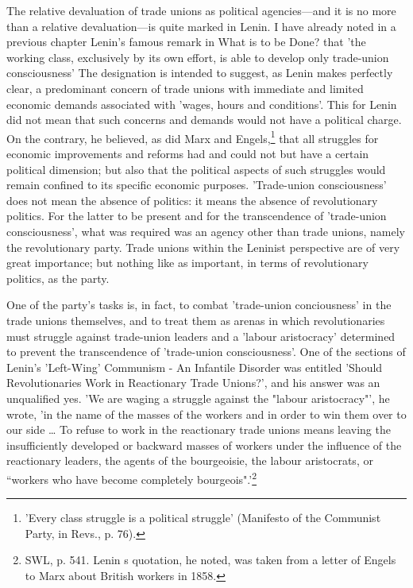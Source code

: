 The relative devaluation of trade unions as political agencies—and it is no more than a relative devaluation—is quite marked in Lenin. I have already noted in a previous chapter Lenin's famous remark in What is to be Done? that 'the working class, exclusively by its own effort, is able to develop only trade-union consciousness' The designation is intended to suggest, as Lenin makes perfectly clear, a predominant concern of trade unions with immediate and limited economic demands associated with 'wages, hours and conditions'. This for Lenin did not mean that such concerns and demands would not have a political charge. On the contrary, he believed, as did Marx and Engels,\footnote{'Every class struggle is a political struggle' (Manifesto of the Communist Party, in Revs., p. 76).} that all struggles for economic improvements and reforms had and could not but have a certain political dimension; but also that the political aspects of such struggles would remain confined to its specific economic purposes. 'Trade\hyp{}union consciousness' does not mean the absence of politics: it means the absence of revolutionary politics. For the latter to be present and for the transcendence of 'trade-union consciousness', what was required was an agency other than trade unions, namely the revolutionary party. Trade unions within the Leninist perspective are of very great importance; but nothing like as important, in terms of revolutionary politics, as the party.

One of the party's tasks is, in fact, to combat 'trade-union conciousness' in the trade unions themselves, and to treat them as arenas in which revolutionaries must struggle against trade\hyp{}union leaders and a 'labour aristocracy' determined to prevent the transcendence of 'trade-union consciousness'. One of the sections of Lenin's 'Left-Wing' Communism - An Infantile Disorder was entitled 'Should Revolutionaries Work in Reactionary Trade Unions?', and his answer was an unqualified yes. 'We are waging a struggle against the "labour aristocracy"', he wrote, 'in the name of the masses of the workers and in order to win them over to our side \dots{} To refuse to work in the reactionary trade unions means leaving the insufficiently developed or backward masses of workers under the influence of the reactionary leaders, the agents of the bourgeoisie, the labour aristocrats, or “workers who have become completely bourgeois".'\footnote{SWL, p. 541. Lenin s quotation, he noted, was taken from a letter of Engels to Marx about British workers in 1858.}

